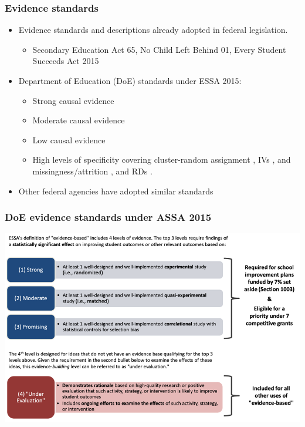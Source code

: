 \documentclass[usenames,dvipsnames]{beamer}
\begin{document}
\begin{frame}
\frametitle{Evidence standards}

\begin{itemize}
\item Evidence standards and descriptions already adopted in federal legislation.
\begin{itemize}
\item Secondary Education Act 65, No Child Left Behind 01, Every Student Succeeds Act 2015
\end{itemize}
\pause
\vspace{0.5cm}
\item Department of Education (DoE) standards under ESSA 2015:
\begin{itemize}
\item Strong causal evidence
\item Moderate causal evidence
\item Low causal evidence
\item High levels of specificity covering cluster-random assignment \hyperlink{doe_cluster}{}, IVs \hyperlink{doe_iv}{}, and missingness/attrition \hyperlink{doe_missing}{}, and RDs \hyperlink{doe_rd}{}. 
\end{itemize}
\pause
\item Other federal agencies have adopted similar standards \hyperlink{other_agencies}{}        
\end{itemize}

\end{frame}


\begin{frame}
\frametitle{DoE evidence standards under ASSA 2015}

\begin{center}
\vspace{-0.85cm}
\hspace*{-1cm}
\includegraphics[scale=0.75]{../figs/doe_tiers.png}
\end{center}






\end{frame}
\end{document}
